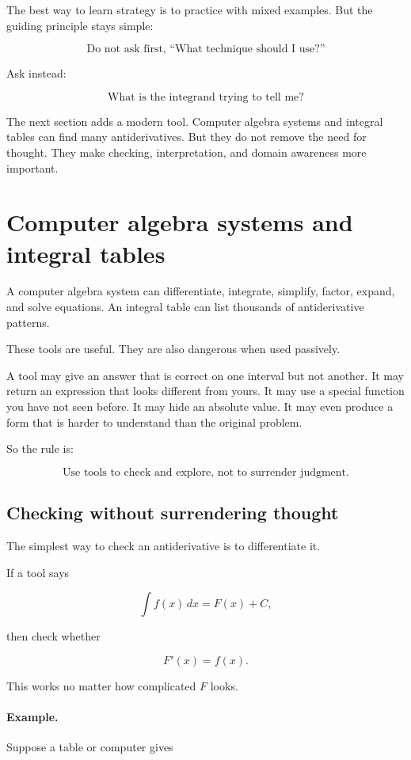 The best way to learn strategy is to practice with mixed examples.  But the guiding
principle stays simple:

\[
\boxed{
\text{Do not ask first, ``What technique should I use?''}
}
\]

Ask instead:

\[
\boxed{
\text{What is the integrand trying to tell me?}
}
\]

The next section adds a modern tool.  Computer algebra systems and integral tables can
find many antiderivatives.  But they do not remove the need for thought.  They make
checking, interpretation, and domain awareness more important.

\section{Computer algebra systems and integral tables}
\label{sec:cas-and-integral-tables}

A computer algebra system can differentiate, integrate, simplify, factor, expand, and
solve equations.  An integral table can list thousands of antiderivative patterns.

These tools are useful.  They are also dangerous when used passively.

A tool may give an answer that is correct on one interval but not another.  It may return
an expression that looks different from yours.  It may use a special function you have not
seen before.  It may hide an absolute value.  It may even produce a form that is harder to
understand than the original problem.

So the rule is:

\[
\boxed{
\text{Use tools to check and explore, not to surrender judgment.}
}
\]

\subsection{Checking without surrendering thought}
\label{subsec:checking-without-surrendering-thought}

The simplest way to check an antiderivative is to differentiate it.

If a tool says

\[
\int f(x)\,dx=F(x)+C,
\]

then check whether

\[
F'(x)=f(x).
\]

This works no matter how complicated \(F\) looks.

\paragraph{Example.}
Suppose a table or computer gives

